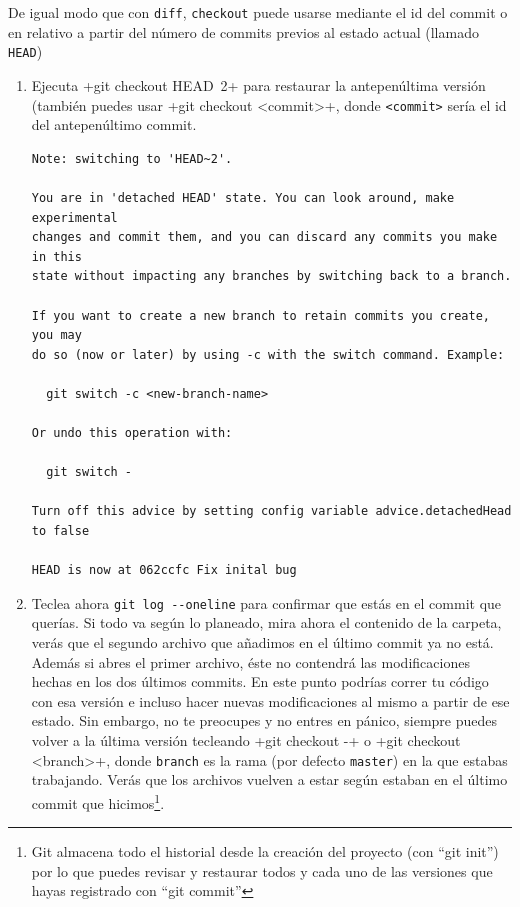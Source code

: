\documentclass[a5paper,10pt]{article}
\begin{document}
    De igual modo que con \verb+diff+, \verb+checkout+ puede usarse mediante el id del commit o en relativo a partir del número de commits previos al estado actual (llamado \verb+HEAD+)\
    \begin{enumerate}
      \item Ejecuta \cverb+git checkout HEAD~2+ para restaurar la antepenúltima versión (también puedes usar \cverb+git checkout <commit>+, donde \verb+<commit>+ sería el id del antepenúltimo commit.
      
      \begin{lstlisting}[style=custom]
Note: switching to 'HEAD~2'.

You are in 'detached HEAD' state. You can look around, make experimental
changes and commit them, and you can discard any commits you make in this
state without impacting any branches by switching back to a branch.

If you want to create a new branch to retain commits you create, you may
do so (now or later) by using -c with the switch command. Example:

  git switch -c <new-branch-name>

Or undo this operation with:

  git switch -

Turn off this advice by setting config variable advice.detachedHead to false

HEAD is now at 062ccfc Fix inital bug
    \end{lstlisting}
      
    \item Teclea ahora \verb+git log --oneline+ para confirmar que estás en el commit que querías. Si todo va según lo planeado, mira ahora el contenido de la carpeta, verás que el segundo archivo que añadimos en el último commit ya no está. Además si abres el primer archivo, éste no contendrá las modificaciones hechas en los dos últimos commits. En este punto podrías correr tu código con esa versión e incluso hacer nuevas modificaciones al mismo a partir de ese estado. Sin embargo, no te preocupes y no entres en pánico, siempre puedes volver a la última versión tecleando \cverb+git checkout -+ o \cverb+git checkout <branch>+, donde \verb+branch+ es la rama (por defecto \verb+master+) en la que estabas trabajando. Verás que los archivos vuelven a estar según estaban en el último commit que hicimos\footnote{Git almacena todo el historial desde la creación del proyecto (con ``git init'') por lo que puedes revisar y restaurar todos y cada uno de las versiones que hayas registrado con ``git commit''}.


\end{enumerate}
\end{document}
